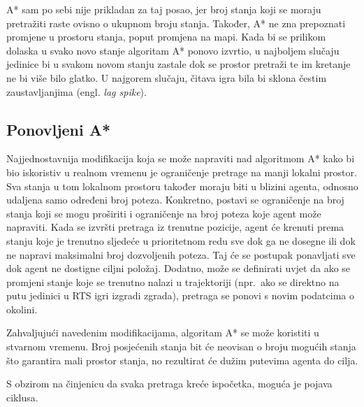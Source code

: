 \documentclass[times, utf8, zavrsni, numeric]{fer}
\begin{document}
\par A* sam po sebi nije prikladan za taj posao, jer broj stanja koji se moraju pretražiti raste ovisno o ukupnom broju stanja. 
Također, A* ne zna prepoznati promjene u prostoru stanja, poput promjena na mapi. Kada bi se prilikom dolaska u svako novo stanje algoritam A* ponovo izvrtio, u najboljem slučaju jedinice bi u svakom novom stanju zastale dok se prostor pretraži te im kretanje ne bi više bilo glatko. 
U najgorem slučaju, čitava igra bila bi sklona čestim zaustavljanjima (engl. \textit{lag spike}).

\subsection{Ponovljeni A*}

\par Najjednostavnija modifikacija koja se može napraviti nad algoritmom A* kako bi bio iskoristiv u realnom vremenu je ograničenje pretrage na manji lokalni prostor.
Sva stanja u tom lokalnom prostoru također moraju biti u blizini agenta, odnosno udaljena samo određeni broj poteza.
Konkretno, postavi se ograničenje na broj stanja koji se mogu proširiti i ograničenje na broj poteza koje agent može napraviti.
Kada se izvršti pretraga iz trenutne pozicije, agent će krenuti prema stanju koje je trenutno sljedeće u prioritetnom redu sve dok ga ne dosegne ili dok ne napravi maksimalni broj dozvoljenih poteza.
Taj će se postupak ponavljati sve dok agent ne dostigne ciljni položaj.
Dodatno, može se definirati uvjet da ako se promjeni stanje koje se trenutno nalazi u trajektoriji (npr.\ ako se direktno na putu jedinici u RTS igri izgradi zgrada), pretraga se ponovi s novim podatcima o okolini.

\par Zahvaljujući navedenim modifikacijama, algoritam A* se može koristiti u stvarnom vremenu. 
Broj posjećenih stanja bit će neovisan o broju mogućih stanja što garantira mali prostor stanja, no rezultirat će dužim putevima agenta do cilja.

\par S obzirom na činjenicu da svaka pretraga kreće ispočetka, moguća je pojava ciklusa. 
\end{document}
